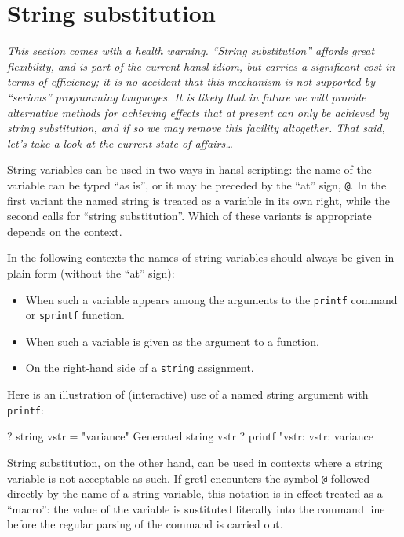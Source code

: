 \section{String substitution}
\label{sec:stringsub}

\textsl{This section comes with a health warning. ``String
  substitution'' affords great flexibility, and is part of the current
  hansl idiom, but carries a significant cost in terms of efficiency;
  it is no accident that this mechanism is not supported by
  ``serious'' programming languages. It is likely that in future we
  will provide alternative methods for achieving effects that at
  present can only be achieved by string substitution, and if so we
  may remove this facility altogether. That said, let's take a look at
  the current state of affairs\dots{}}

String variables can be used in two ways in hansl scripting: the name
of the variable can be typed ``as is'', or it may be preceded by the
``at'' sign, \verb|@|. In the first variant the named string is
treated as a variable in its own right, while the second calls for
``string substitution''. Which of these variants is appropriate
depends on the context.

In the following contexts the names of string variables should always
be given in plain form (without the ``at'' sign):

\begin{itemize}
\item When such a variable appears among the arguments to the
  \texttt{printf} command or \texttt{sprintf} function.
\item When such a variable is given as the argument to a function.
\item On the right-hand side of a \texttt{string} assignment.
\end{itemize}

Here is an illustration of (interactive) use of a named string
argument with \texttt{printf}:
%
\begin{code}
? string vstr = "variance"
Generated string vstr
? printf "vstr: %
vstr:     variance
\end{code}

String substitution, on the other hand, can be used in contexts where
a string variable is not acceptable as such. If gretl encounters
the symbol \verb|@| followed directly by the name of a string
variable, this notation is in effect treated as a ``macro'': the value
of the variable is sustituted literally into the command line before
the regular parsing of the command is carried out.


